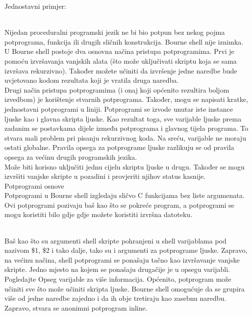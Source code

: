 \documentclass[11pt]{book}
\begin{document}
Jednostavni primjer:\\

\\

Nijedan proceduralni programski jezik ne bi bio potpun bez nekog pojma potprograma, funkcija ili drugih sličnih konstrukcija. Bourne shell nije iznimka.\\
U Bourne shell postoje dva osnovna načina pristupa potprogramima. 
Prvi je pomoću izvršavanja vanjskih alata (što može uključivati skriptu koja se sama izvršava rekurzivno). Također možete učiniti da izvršenje jedne naredbe bude uvjetovano kodom rezultata koji je vratila druga naredba.\\
Drugi način pristupa potprogramima (i onaj koji općenito rezultira boljom izvedbom) je korištenje stvarnih potprograma.  Također, mogu se napisati kratke, jednostavni potprogrami u liniji.
Potprogrami se izvode unutar iste instance ljuske kao i glavna skripta ljuske. Kao rezultat toga, sve varijable ljuske prema zadanim se postavkama dijele između potprograma i glavnog tijela programa. To stvara mali problem pri pisanju rekurzivnog koda. Na sreću, varijable ne moraju ostati globalne.
Pravila opsega za potprograme ljuske razlikuju se od pravila opsega za većinu drugih programskih jezika.\\
Može biti korisno uključiti jednu cijelu skriptu ljuske u drugu. Također se mogu izvršiti vanjske skripte u pozadini i provjeriti njihov status kasnije.\\
Potprogrami osnove\\
Potprogrami u Bourne shell izgledaju sličvo C funkcijama bez liste argumenata. Ovi potprogrami pozivaju baš kao što se pokreće program, a potprogrami se mogu koristiti bilo gdje gdje možete koristiti izvršna datoteku.\\

\\

Baš kao što su argumenti shell skripte pohranjeni u shell varijablama pod nazivom \$1, \$2 i tako dalje, tako su i argumenti za potprograme ljuske. Zapravo, na većinu načina, shell potprogrami se ponašaju tačno kao izvršavanje vanjske skripte. Jedno mjesto na kojem se ponašaju drugačije je u opsegu varijabli. Pogledajte Opseg varijable za više informacija. Općenito, potprogram može učiniti sve što može učiniti skripta ljuske.
Bourne shell omogućuje da se grupira više od jedne naredbe zajedno i da ih obje tretiraju kao zasebnu naredbu. Zapravo, stvara se anonimni potprogram inline. 
\end{document}
